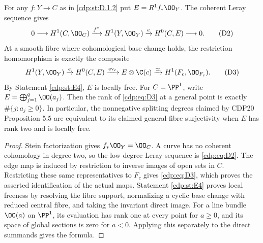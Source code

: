 
\begin{proposition}\label{cdp:st:D.1.4}
For any $f:Y\to C$ as in \ref{cdp:st:D.1.2} put $E=R^1f_*\OO_Y$.
The coherent Leray sequence gives
\[
0\longrightarrow H^1(C,\OO_C)\xrightarrow{f^*}H^1(Y,\OO_Y)
\xrightarrow{e}H^0(C,E)\longrightarrow0.               \tag{D2}\label{cdp:eq:D2}
\]
At a smooth fibre where cohomological base change holds, the
restriction homomorphism is exactly the composite
\[
H^1(Y,\OO_Y)\xrightarrow{e}H^0(C,E)
\xrightarrow{\operatorname{ev}_c}E\otimes\C(c)
\xrightarrow{\simeq}H^1(F_c,\OO_{F_c}).               \tag{D3}\label{cdp:eq:D3}
\]
By Statement \ref{cdp:st:E4}, $E$ is locally free. For $C=\PP^1$, write
$E=\bigoplus_{j=1}^q\OO(a_j)$.
Then the rank of \eqref{cdp:eq:D3} at a general point is exactly
$\#\{j:a_j\geq0\}$. In particular, the nonnegative splitting
degrees claimed by CDP20 Proposition 5.5 are equivalent to its
claimed general-fibre surjectivity when $E$ has rank two and is
locally free.
\end{proposition}
\begin{proof}
Stein factorization gives $f_*\OO_Y=\OO_C$. A curve has no coherent
cohomology in degree two, so the low-degree Leray sequence is \eqref{cdp:eq:D2}.
The edge map is induced by restriction to inverse images of open
sets in $C$. Restricting these same representatives to $F_c$ gives
\eqref{cdp:eq:D3}, which proves the asserted identification of the actual maps.
Statement \ref{cdp:st:E4} proves local freeness by resolving the fibre support,
normalizing a cyclic base change with reduced central fibre, and
taking the invariant direct image. For a line bundle
$\OO(a)$ on $\PP^1$, its evaluation has rank one at every point
for $a\geq0$, and its space of global sections is zero for $a<0$.
Applying this separately to the direct summands gives the formula.
\end{proof}


